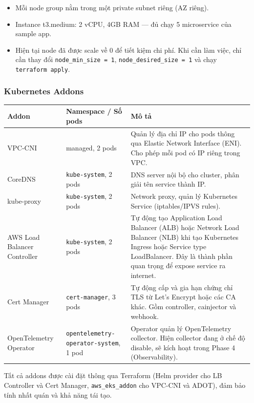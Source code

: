 \documentclass[12pt,a4paper]{article}
\begin{document}
\begin{itemize}[leftmargin=*,nosep]
  \item Mỗi node group nằm trong một private subnet riêng (AZ riêng).
  \item Instance t3.medium: 2 vCPU, 4GB RAM — đủ chạy 5 microservice của sample app.
  \item Hiện tại node đã được scale về 0 để tiết kiệm chi phí. Khi cần làm việc, chỉ cần thay đổi \texttt{node\_min\_size = 1}, \texttt{node\_desired\_size = 1} và chạy \texttt{terraform apply}.
\end{itemize}

\subsubsection{Kubernetes Addons}

\begin{longtable}{p{} p{} p{}}
\toprule
\textbf{Addon} & \textbf{Namespace / Số pods} & \textbf{Mô tả} \\
\midrule
VPC-CNI &
managed, 2 pods &
Quản lý địa chỉ IP cho pods thông qua Elastic Network Interface (ENI). Cho phép mỗi pod có IP riêng trong VPC. \\
\midrule
CoreDNS &
\texttt{kube-system}, 2 pods &
DNS server nội bộ cho cluster, phân giải tên service thành IP. \\
\midrule
kube-proxy &
\texttt{kube-system}, 2 pods &
Network proxy, quản lý Kubernetes Service (iptables/IPVS rules). \\
\midrule
AWS Load Balancer Controller &
\texttt{kube-system}, 2 pods &
Tự động tạo Application Load Balancer (ALB) hoặc Network Load Balancer (NLB) khi tạo Kubernetes Ingress hoặc Service type LoadBalancer. Đây là thành phần quan trọng để expose service ra internet. \\
\midrule
Cert Manager &
\texttt{cert-manager}, 3 pods &
Tự động cấp và gia hạn chứng chỉ TLS từ Let's Encrypt hoặc các CA khác. Gồm controller, cainjector và webhook. \\
\midrule
OpenTelemetry Operator &
\texttt{opentelemetry-operator-system}, 1 pod &
Operator quản lý OpenTelemetry collector. Hiện collector đang ở chế độ disable, sẽ kích hoạt trong Phase 4 (Observability). \\
\bottomrule
\end{longtable}

Tất cả addons được cài đặt thông qua Terraform (Helm provider cho LB Controller và Cert Manager, \texttt{aws\_eks\_addon} cho VPC-CNI và ADOT), đảm bảo tính nhất quán và khả năng tái tạo.
\end{document}
